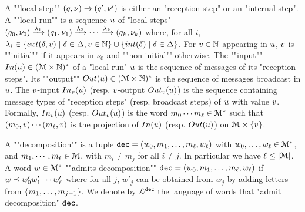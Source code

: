 	\AP A ""local step"" $(q,\nu) \xrightarrow{} (q',\nu')$ is either an "reception step" or an "internal step". 
	\AP A ""local run"" is a sequence $u$ of "local steps" $(q_0, \nu_0) \xrightarrow{\lambda_1} (q_1, \nu_1) \xrightarrow{\lambda_2} \cdots \xrightarrow{\lambda_k} (q_k, \nu_k)$ where, for all $i$, $\locallabel_i \in \set{\extlabel{\atrans}{\aval} \mid \atrans \in \transitions, \aval \in \nats} \cup \set{\intlabel{\atrans} \mid \atrans \in \transitions}$. 
	For $v \in \mathbb{N}$ appearing in $u$, $v$ is ""initial"" if it appears in $\nu_0$ and ""non-initial"" otherwise. 
	The ""input"" $\Input{\localrun} \in (\messages \times \nats)^*$ of a "local run" $u$ is the sequence of messages of its "reception steps". Its ""output"" $\Output{\localrun} \in (\messages \times \nats)^*$ is the sequence of messages broadcast in $u$. The $v$-input $\vinput{\aval}{\localrun}$ (resp. $v$-output $\voutput{\aval}{\localrun}$) is the sequence containing message types of "reception steps" (resp. broadcast steps) of $u$ with value $v$. Formally, $\vinput{\aval}{\localrun}$ (resp. $\voutput{\aval}{\localrun}$) is the word $m_0 \cdots m_{\ell} \in \mathcal{M}^*$ such that $(m_0, v) \cdots (m_{\ell}, v)$ is the projection of $\Input{\localrun}$ (resp. $\Output{\localrun}$) on $\mathcal{M} \times \{v\}$. 
 
	A ""decomposition"" is a tuple $\mathtt{dec} = (w_0, m_1, \ldots, m_\ell, w_\ell)$ with $w_0, \ldots, w_\ell \in \mathcal{M}^*$, and $m_1, \cdots, m_\ell \in \mathcal{M}$, with $m_i \neq m_j$ for all $i\neq j$. In particular we have $\ell \leq |\mathcal{M}|$. 
	A word $w \in \mathcal{M}^*$ ""admits decomposition"" $\mathtt{dec} = (w_0, m_1, \ldots, m_\ell, w_\ell)$ if $w \preceq w'_0 w'_1 \cdots w'_\ell$ where for all $j$, $w'_j$ can be obtained from $w_j$ by adding letters from $\{m_1, \ldots, m_{j-1}\}$. 
	We denote by $\mathcal{L}^{\mathtt{\mathtt{dec}}}$ the language of words that "admit decomposition" $\mathtt{dec}$. 

